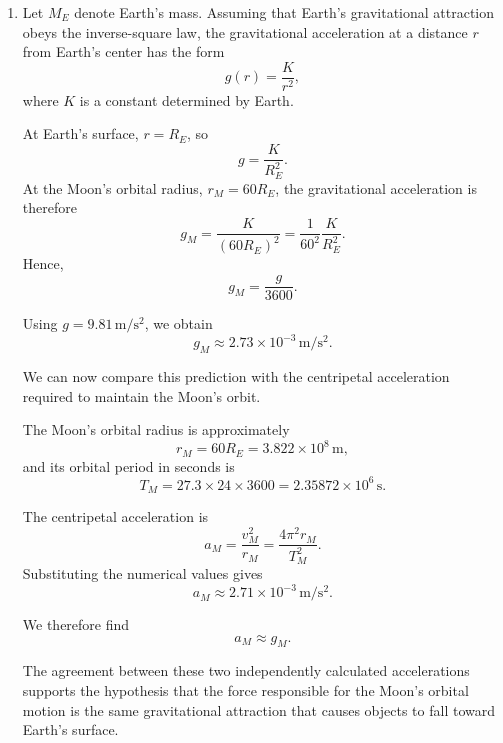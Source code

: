 \documentclass[12pt]{article}
\begin{document}
\begin{enumerate}
    \item[(d)] Let $M_E$ denote Earth's mass. Assuming that
    Earth's gravitational attraction obeys the inverse-square
    law, the gravitational acceleration at a distance $r$
    from Earth's center has the form
    \begin{equation}
        g(r)=\frac{K}{r^2},
    \end{equation}
    where $K$ is a constant determined by Earth.

    At Earth's surface, $r=R_E$, so
    \begin{equation}
        g=\frac{K}{R_E^2}.
    \end{equation}
    At the Moon's orbital radius, $r_M=60R_E$,
    the gravitational acceleration is therefore
    \begin{equation}
        g_M=\frac{K}{(60R_E)^2}
        =\frac{1}{60^2}\frac{K}{R_E^2}.
    \end{equation}
    Hence,
    \begin{equation}
        \boxed{g_M=\frac{g}{3600}.}
    \end{equation}

    Using $g=9.81\,\mathrm{m/s^2}$, we obtain
    \begin{equation}
        \boxed{g_M\approx2.73\times10^{-3}\,\mathrm{m/s^2}.}
    \end{equation}

    We can now compare this prediction with the centripetal
    acceleration required to maintain the Moon's orbit.

    The Moon's orbital radius is approximately
    \begin{equation}
        r_M=60R_E=3.822\times10^8\,\mathrm{m},
    \end{equation}
    and its orbital period in seconds is
    \begin{equation}
        T_M=27.3\times24\times3600
        =2.35872\times10^6\,\mathrm{s}.
    \end{equation}

    The centripetal acceleration is
    \begin{equation}
        a_M=\frac{v_M^2}{r_M}
        =\frac{4\pi^2r_M}{T_M^2}.
    \end{equation}
    Substituting the numerical values gives
    \begin{equation}
        \boxed{a_M\approx2.71\times10^{-3}\,\mathrm{m/s^2}.}
    \end{equation}

    We therefore find
    \begin{equation}
        \boxed{a_M\approx g_M.}
    \end{equation}

    The agreement between these two independently calculated
    accelerations supports the hypothesis that the force
    responsible for the Moon's orbital motion is the same
    gravitational attraction that causes objects to fall
    toward Earth's surface.
\end{enumerate}
\end{document}
